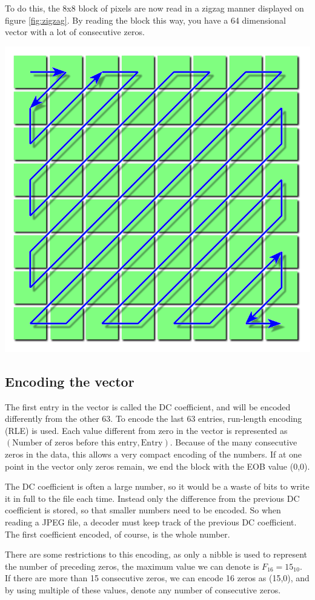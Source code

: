 \begin{infobox}
To do this, the 8x8 block of pixels are now read in a zigzag manner displayed on figure \ref{fig:zigzag}.
By reading the block this way, you have a 64 dimensional vector with a lot of consecutive zeros. 

\begin{centering}
\includegraphics[width=.5\textwidth]{figures/zigzagordering.png}
\label{fig:zigzag}
\end{centering} 

\vspace{4mm}
\subsection*{Encoding the vector}
\vspace{-2.5mm}
The first entry in the vector is called the DC coefficient, and will be encoded differently from the other 63. To encode the last 63 entries, run-length encoding (RLE) is used. Each value different from zero in the vector is represented as $(\text{Number of zeros before this entry}, \text{Entry})$. Because of the many consecutive zeros in the data, this allows a very compact encoding of the numbers. If at one point in the vector only zeros remain, we end the block with the EOB value (0,0). 

The DC coefficient is often a large number, so it would be a waste of bits to write it in full to the file each time. Instead only the difference from the previous DC coefficient is stored, so that smaller numbers need to be encoded. So when reading a JPEG file, a decoder must keep track of the previous DC coefficient. The first coefficient encoded, of course, is the whole number.

There are some restrictions to this encoding, as only a nibble is used to represent the number of preceding zeros, the maximum value we can denote is $F_{16}=15_{10}$.
If there are more than 15 consecutive zeros, we can encode 16 zeros as (15,0), and by using multiple of these values, denote any number of consecutive zeros. 


\end{infobox}
